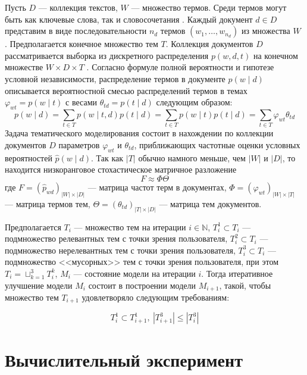 \documentclass{article}
\begin{document}
Пусть $D$ — коллекция текстов, $W$ — множество термов.
Среди термов могут быть как ключевые слова, так и словосочетания \citep{artm2}.
Каждый документ $d \in D$ представим в виде последовательности $n_d$ термов $\left( w_1, \dots, w_{n_d} \right)$ из множества $W$ \citep{artm}.
Предполагается конечное множество тем $T$.
Коллекция документов $D$ рассматривается выборка из дискретного распределения $p(w, d, t)$ на конечном множестве $W \times D \times T$ \citep{artm2}.
 Согласно формуле полной вероятности и гипотезе условной независимости, распределение термов в документе $p(w \mid d)$ описывается вероятностной смесью распределений термов в темах $\varphi_{wt} = p(w \mid t)$ с весами $\theta_{td} = p (t \mid d)$ следующим образом: \citep{bigartm}
 $$p(w \mid d) = \sum \limits_{t \in T} p(w \mid t, d) p(t \mid d) = \sum \limits_{t \in T} p (w \mid t) p (t \mid d) = \sum \limits_{t \in T} \varphi_{wt} \theta_{td}$$
 Задача тематического моделирования состоит в нахождении по коллекции документов $D$ параметров $\varphi_{wt}$ и $\theta_{td}$, приближающих частотные оценки условных вероятностей $\widehat{p} (w \mid d)$.
 Так как $|T|$ обычно намного меньше, чем $|W|$ и $|D|$, то находится низкоранговое стохастическое матричное разложение \citep{artm2}
 $$F \approx \Phi \Theta$$ 
 где $F = {(\widehat{p}_{wd})}_{|W| \times |D|}$ — матрица частот терм в документах, $\Phi = {(\varphi_{wt})}_{|W| \times |T|}$ — матрица термов тем, $\Theta = {(\theta_{td})}_{|T| \times |D|}$ — матрица тем документов.

Предполагается $T_i$ — множество тем на итерации $i \in \mathbb{N}$,  $T_i^1 \subset T_i$ — подмножество релевантных тем с точки зрения пользователя, $T_i^2 \subset T_i$ — подмножество нерелевантных тем с точки зрения пользователя, $T_i^3 \subset T_i$ — подмножество <<мусорных>> тем с точки зрения пользователя, при этом $T_i = \sqcup_{k = 1}^3 T_i^k$, $M_i$ — состояние модели на итерации $i$.
Тогда итеративное улучшение модели $M_i$ состоит в построении модели $M_{i + 1}$, такой, чтобы множество тем $T_{i + 1}$ удовлетворяло следующим требованиям:

$$T_i^1 \subset T_{i + 1}^1, \ \left| T_{i + 1}^3 \right| \leq \left| T_i^3 \right|$$


\section{Вычислительный эксперимент}
\end{document}

